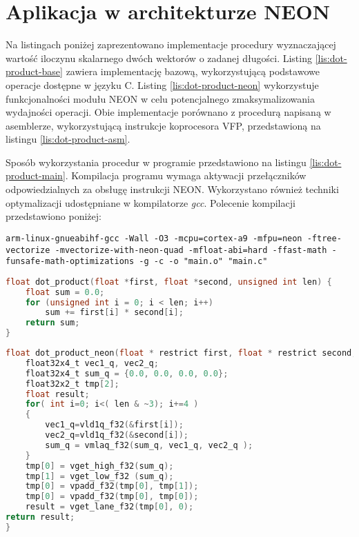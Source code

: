 \section{Aplikacja w architekturze NEON}
\label{cha:neon-source}


Na listingach poniżej zaprezentowano implementacje procedury wyznaczającej wartość iloczynu skalarnego dwóch wektorów o zadanej długości. Listing \ref{lis:dot-product-base} zawiera implementację bazową, wykorzystującą podstawowe operacje dostępne w języku C.
Listing \ref{lis:dot-product-neon} wykorzystuje funkcjonalności modułu NEON w celu potencjalnego zmaksymalizowania wydajności operacji. Obie implementacje porównano z procedurą napisaną w asemblerze, wykorzystującą instrukcje koprocesora VFP, przedstawioną na listingu \ref{lis:dot-product-asm}.

Sposób wykorzystania procedur w programie przedstawiono na listingu \ref{lis:dot-product-main}. Kompilacja programu wymaga aktywacji przełączników odpowiedzialnych za obsługę instrukcji NEON. Wykorzystano również techniki optymalizacji udostępniane w kompilatorze \textit{gcc}. Polecenie kompilacji przedstawiono poniżej:

\begin{lstlisting}[breaklines=true]
arm-linux-gnueabihf-gcc -Wall -O3 -mcpu=cortex-a9 -mfpu=neon -ftree-vectorize -mvectorize-with-neon-quad -mfloat-abi=hard -ffast-math -funsafe-math-optimizations -g -c -o "main.o" "main.c"
\end{lstlisting}

\begin{lstlisting}[breaklines=true, language=C, caption=Implementacja bazowa., label=lis:dot-product-base]
float dot_product(float *first, float *second, unsigned int len) {
	float sum = 0.0;
	for (unsigned int i = 0; i < len; i++)
		sum += first[i] * second[i];
	return sum;
}
\end{lstlisting}

\begin{lstlisting}[breaklines=true, language=C, caption=Implementacja w architekturze NEON. (Źródło: \cite{xilinx-neon}), label=lis:dot-product-neon]
float dot_product_neon(float * restrict first, float * restrict second, unsigned int len) {
	float32x4_t vec1_q, vec2_q;
	float32x4_t sum_q = {0.0, 0.0, 0.0, 0.0};
	float32x2_t tmp[2];
	float result;
	for( int i=0; i<( len & ~3); i+=4 )
	{
		vec1_q=vld1q_f32(&first[i]);
		vec2_q=vld1q_f32(&second[i]);
		sum_q = vmlaq_f32(sum_q, vec1_q, vec2_q );
	}
	tmp[0] = vget_high_f32(sum_q);
	tmp[1] = vget_low_f32 (sum_q);
	tmp[0] = vpadd_f32(tmp[0], tmp[1]);
	tmp[0] = vpadd_f32(tmp[0], tmp[0]);
	result = vget_lane_f32(tmp[0], 0);
return result;
}
\end{lstlisting}

